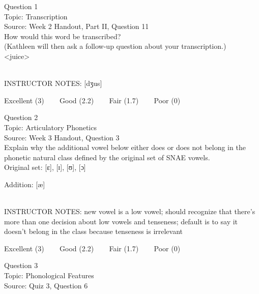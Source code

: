 \documentclass[12pt]{article}
\begin{document}
\begin{center}
\textbf{{\color{blue}{\HUGE START OF EXAM\\}}}

\textbf{{\color{blue}{\HUGE Student ID: 65295\\}}}

\textbf{{\color{blue}{\HUGE \\}}}

\end{center}
\newpage

{\large Question 1}\\

Topic: Transcription\\
Source: Week 2 Handout, Part II, Question 11\\

How would this word be transcribed?\\ (Kathleen will then ask a follow-up question about your transcription.)\\

<juice>


~\\
INSTRUCTOR NOTES: [dʒus]


\vfill
Excellent (3) ~~~ Good (2.2) ~~~ Fair (1.7) ~~~ Poor (0)
\newpage

{\large Question 2}\\

Topic: Articulatory Phonetics\\
Source: Week 3 Handout, Question 3\\

Explain why the additional vowel below either does or does not belong in the phonetic natural class defined by the original set of SNAE vowels.\\

Original set: {[ɛ]}, {[ɪ]}, {[ʊ]}, {[ɔ]}

Addition: {[æ]}


~\\
INSTRUCTOR NOTES: new vowel is a low vowel; should recognize that there's more than one decision about low vowels and tenseness; default is to say it doesn't belong in the class because tenseness is irrelevant


\vfill
Excellent (3) ~~~ Good (2.2) ~~~ Fair (1.7) ~~~ Poor (0)
\newpage

{\large Question 3}\\

Topic: Phonological Features\\
Source: Quiz 3, Question 6\\
\end{document}
